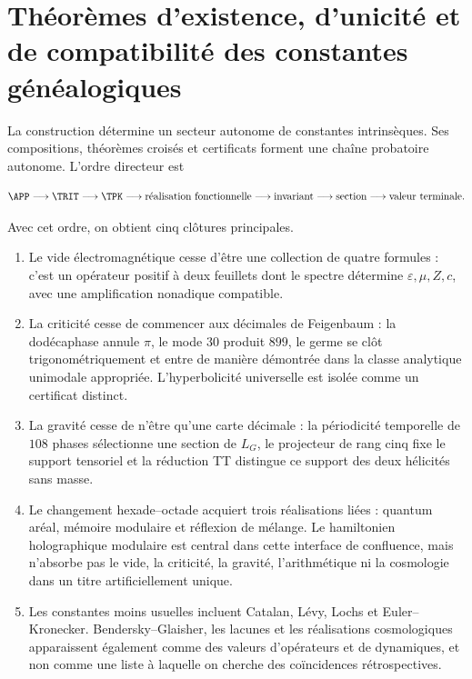 
\section{Théorèmes d'existence, d'unicité et de compatibilité des constantes généalogiques}

La construction détermine un secteur autonome de constantes intrinsèques.
Ses compositions, théorèmes croisés et certificats forment une chaîne
probatoire autonome. L'ordre directeur est

{\small
\begin{equation}
\APP\longrightarrow\TRIT\longrightarrow\TPK
\longrightarrow\text{réalisation fonctionnelle}
\longrightarrow\text{invariant}
\longrightarrow\text{section}
\longrightarrow\text{valeur terminale}.
\label{eq:final-causal-chain}
\end{equation}
}

Avec cet ordre, on obtient cinq clôtures principales.

\begin{enumerate}
\item Le vide électromagnétique cesse d'être une collection de quatre
formules : c'est un opérateur positif à deux feuillets dont le spectre détermine
\(\varepsilon,\mu,Z,c\), avec une amplification nonadique compatible.

\item La criticité cesse de commencer aux décimales de Feigenbaum : la
dodécaphase annule \(\pi\), le mode \(30\) produit \(899\), le germe se clôt
trigonométriquement et entre de manière démontrée dans la classe analytique
unimodale appropriée. L'hyperbolicité universelle est isolée comme un
certificat distinct.

\item La gravité cesse de n'être qu'une carte décimale : la périodicité temporelle de \(108\) phases sélectionne une
section de \(L_G\), le projecteur de rang cinq fixe le support tensoriel et
la réduction TT distingue ce support des deux hélicités sans masse.

\item Le changement hexade--octade acquiert trois réalisations liées :
quantum
aréal, mémoire modulaire et réflexion de mélange. Le hamiltonien holographique
modulaire est central dans cette interface de confluence, mais n'absorbe pas le vide, la criticité,
la gravité, l'arithmétique ni la cosmologie dans un titre artificiellement
unique.

\item Les constantes moins usuelles incluent Catalan, Lévy, Lochs et
Euler--Kronecker. Bendersky--Glaisher, les lacunes et les réalisations cosmologiques
apparaissent également comme des valeurs d'opérateurs et de dynamiques, et non comme une liste
à laquelle on cherche des coïncidences rétrospectives.
\end{enumerate}

